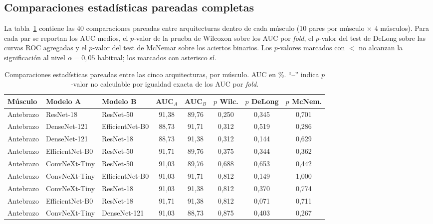 \documentclass[12pt]{extarticle}
\numberwithin{equation}{section}
\begin{document}
\subsection{Comparaciones estadísticas pareadas completas}\label{subsec:anexo-pares}

La tabla~\ref{tab:pares-completos} contiene las 40 comparaciones pareadas entre arquitecturas dentro de cada músculo (10 pares por músculo $\times$ 4 músculos). Para cada par se reportan los AUC medios, el $p$-valor de la prueba de Wilcoxon sobre los AUC por \textit{fold}, el $p$-valor del test de DeLong sobre las curvas ROC agregadas y el $p$-valor del test de McNemar sobre los aciertos binarios. Los $p$-valores marcados con $<$ no alcanzan la significación al nivel $\alpha=0{,}05$ habitual; los marcados con asterisco sí.

\begin{table}[H]
\centering
\caption{Comparaciones estadísticas pareadas entre las cinco arquitecturas, por músculo. AUC en \%. ``--'' indica $p$-valor no calculable por igualdad exacta de los AUC por \textit{fold}.}
\label{tab:pares-completos}
\scriptsize
\begin{tabular}{lllccccc}
\toprule
\textbf{Músculo} & \textbf{Modelo A} & \textbf{Modelo B} & \textbf{AUC$_A$} & \textbf{AUC$_B$} & \textbf{$p$ Wilc.} & \textbf{$p$ DeLong} & \textbf{$p$ McNem.} \\
\midrule
Antebrazo & ResNet-18       & ResNet-50       & 91{,}38 & 89{,}76 & 0{,}250 & 0{,}345 & 0{,}701 \\
Antebrazo & DenseNet-121    & EfficientNet-B0 & 88{,}73 & 91{,}71 & 0{,}312 & 0{,}519 & 0{,}286 \\
Antebrazo & DenseNet-121    & ResNet-18       & 88{,}73 & 91{,}38 & 0{,}312 & 0{,}144 & 0{,}629 \\
Antebrazo & EfficientNet-B0 & ResNet-50       & 91{,}71 & 89{,}76 & 0{,}375 & 0{,}344 & 0{,}362 \\
Antebrazo & ConvNeXt-Tiny   & ResNet-50       & 91{,}03 & 89{,}76 & 0{,}688 & 0{,}653 & 0{,}442 \\
Antebrazo & ConvNeXt-Tiny   & EfficientNet-B0 & 91{,}03 & 91{,}71 & 0{,}812 & 0{,}149 & 1{,}000 \\
Antebrazo & ConvNeXt-Tiny   & ResNet-18       & 91{,}03 & 91{,}38 & 0{,}812 & 0{,}370 & 0{,}774 \\
Antebrazo & EfficientNet-B0 & ResNet-18       & 91{,}71 & 91{,}38 & 0{,}812 & 0{,}071 & 0{,}711 \\
Antebrazo & ConvNeXt-Tiny   & DenseNet-121    & 91{,}03 & 88{,}73 & 0{,}875 & 0{,}403 & 0{,}267 \\

\end{tabular}
\end{table}
\end{document}
